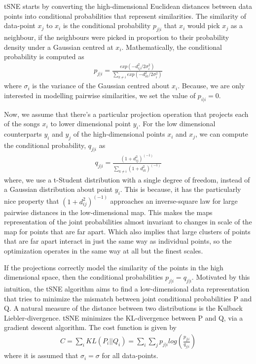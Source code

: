 \documentclass[10pt]{article}
\begin{document}
tSNE starts by converting the high-dimensional Euclidean distances between data points  into conditional probabilities that represent similarities. The similarity of data-point $x_j$ to $x_i$ is the conditional probability $p_{j|i}$ that $x_i$ would pick $x_j$ as a neighbour, if the neighbours were picked in proportion to their probability density under a Gaussian centred at $x_i$. Mathematically, the conditional probability is computed as
\begin{align}
p_{j|i} = \frac{exp( - d_{ij}^2/ 2\sigma_i^2)}{\sum_{k \ne i} exp( - d_{ik}^2/ 2\sigma_i^2)}\label{eq:prob_nbr_HD}
\end{align} where $\sigma_i$ is the variance of the Gaussian centred about $x_i$. Because, we are only interested  in modelling pairwise similarities, we set the value of $p_{i|i} = 0$.

Now, we assume that there's a particular projection operation that projects each of the songs $x_i$ to lower dimensional point $y_i$. For the low dimensional counterparts $y_i$ and $y_j$ of the high-dimensional points $x_i$ and $x_j$, we can compute the conditional probability, $q_{j|i}$ as 
\begin{align}
q_{j|i} = \frac{(1 + d_{ij}^2)^(-1)}{\sum_{k \ne i} (1 + d_{ik}^2)^(-1)}
\end{align}
where, we use a t-Student distribution with a single degree of freedom, instead of a Gaussian distribution about point $y_i$. This is because, it has the particularly nice property that $(1 + d_{ij}^2)^(-1)$ approaches an inverse-square law for large pairwise distances in the low-dimensional map. This makes the maps representation of the joint probabilities almost invariant to changes in scale of the map for points that are far apart. Which also implies that large clusters of points that are far apart interact in just the same way as individual points, so the optimization operates in the same way at all but the finest scales. 

If the projections correctly model the similarity of the points in the high dimensional space, then the conditional probabilities $p_{j|i} = q_{j|i}$. Motivated by this intuition, the tSNE algorithm aims to find a low-dimensional data representation that tries to minimize the mismatch between joint conditional probabilities P and Q.	A natural measure of the distance between two distributions is the Kulback Liebler-divergence. tSNE minimizes the KL-divergence between P and Q, via a gradient descent algorithm. The cost function is given by
\begin{align}
C = \sum_i KL(P_i || Q_i) = \sum_i \sum_j p_{j|i} log(\frac{p_{j|i}}{q_{j|i}})\label{eq:Cost_tSNE}
\end{align}
where it is assumed that $\sigma_i = \sigma$ for all data-points. 
\end{document}
